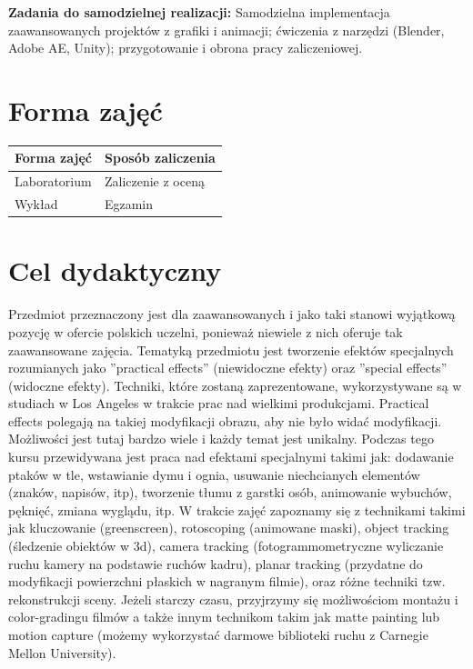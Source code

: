 \documentclass[12pt, a4paper]{article}
\begin{document}
\vspace{4pt}
\noindent\textbf{Zadania do samodzielnej realizacji:} Samodzielna implementacja zaawansowanych projektów z grafiki i animacji; ćwiczenia z narzędzi (Blender, Adobe AE, Unity); przygotowanie i obrona pracy zaliczeniowej.

\section{Forma zajęć}

\begin{tabular}{ll}
  \hline
  \textbf{Forma zajęć} & \textbf{Sposób zaliczenia} \\
  \hline
  Laboratorium & Zaliczenie z oceną \\
  Wykład & Egzamin \\
  \hline
\end{tabular}

\section{Cel dydaktyczny}

Przedmiot przeznaczony jest dla zaawansowanych i jako taki stanowi wyjątkową pozycję w ofercie polskich uczelni, ponieważ niewiele z nich oferuje tak zaawansowane zajęcia. Tematyką przedmiotu jest tworzenie efektów specjalnych rozumianych jako ''practical effects'' (niewidoczne efekty) oraz ''special effects'' (widoczne efekty). Techniki, które zostaną zaprezentowane, wykorzystywane są w studiach w Los Angeles w trakcie prac nad wielkimi produkcjami. Practical effects polegają na takiej modyfikacji obrazu, aby nie było widać modyfikacji. Możliwości jest tutaj bardzo wiele i każdy temat jest unikalny. Podczas tego kursu przewidywana jest praca nad efektami specjalnymi takimi jak: dodawanie ptaków w tle, wstawianie dymu i ognia, usuwanie niechcianych elementów (znaków, napisów, itp), tworzenie tłumu z garstki osób, animowanie wybuchów, pęknięć, zmiana wyglądu, itp. W trakcie zajęć zapoznamy się z technikami takimi jak kluczowanie (greenscreen), rotoscoping (animowane maski), object tracking (śledzenie obiektów w 3d), camera tracking (fotogrammometryczne wyliczanie ruchu kamery na podstawie ruchów kadru), planar tracking (przydatne do modyfikacji powierzchni płaskich w nagranym filmie), oraz różne techniki tzw. rekonstrukcji sceny. Jeżeli starczy czasu, przyjrzymy się możliwościom montażu i color-gradingu filmów a także innym technikom takim jak matte painting lub motion capture (możemy wykorzystać darmowe biblioteki ruchu z Carnegie Mellon University).
\end{document}
